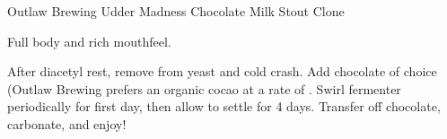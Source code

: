 \begin{recipe}{Outlaw Brewing Udder Madness Chocolate Milk Stout Clone}

\begin{aboutblock}
Full body and rich mouthfeel. \sourceaha
\end{aboutblock}


\begin{methodandtiming}
 
\begin{mashsteps}
\end{mashsteps}

\begin{fermentationsteps}
\end{fermentationsteps}

\begin{directions}
After diacetyl rest, remove from yeast and cold crash. Add chocolate of
choice (Outlaw Brewing prefers an organic cocao at a rate of .
Swirl fermenter periodically for first day, then allow to settle for 4 days.
Transfer off chocolate, carbonate, and enjoy!
\end{directions}

\end{methodandtiming}

\recipebreak

\begin{ingredientsblock}
 
\begin{malts}
\end{malts}

\begin{hops}
\end{hops}


\begin{twists}
\end{twists}

\end{ingredientsblock}

\end{recipe}


